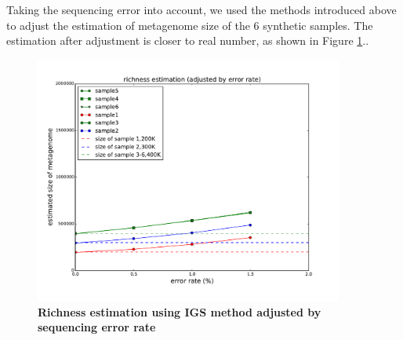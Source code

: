 Taking the sequencing error into account, we used the methods introduced above
to adjust the estimation of metagenome size of the 6 synthetic samples. The
estimation after adjustment is closer to real number, as shown in Figure
\ref{fig:IGS_richness_error_adjustment}..


\begin{figure}[!ht]
 \centerline{\includegraphics[width=4in]{./figures/alpha_by_error_erroronly_adjust.pdf}}
\caption{\bf Richness estimation using IGS method adjusted by sequencing error rate}
\label{fig:IGS_richness_error_adjustment}
\end{figure}

